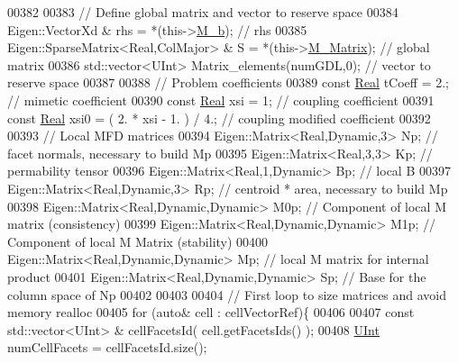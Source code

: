 \begin{DoxyCode}
00382 
00383     \textcolor{comment}{// Define global matrix and vector to reserve space}
00384     Eigen::VectorXd & rhs                       = *(this->\hyperlink{classFVCode3D_1_1StiffMatrix_a5bbfb34d8ef115d2806d5ded5ff109d0}{M\_b});         \textcolor{comment}{// rhs  }
00385     Eigen::SparseMatrix<Real,ColMajor> & S      = *(this->\hyperlink{classFVCode3D_1_1MatrixHandler_ae266bd543d9369501ed9317d9ba6a07b}{M\_Matrix});    \textcolor{comment}{// global matrix}
00386     std::vector<UInt> Matrix\_elements(numGDL,0);                        \textcolor{comment}{// vector to reserve space}
00387     
00388     \textcolor{comment}{// Problem coefficients}
00389     \textcolor{keyword}{const} \hyperlink{namespaceFVCode3D_a40c1f5588a248569d80aa5f867080e83}{Real} tCoeff     = 2.;                            \textcolor{comment}{// mimetic coefficient         }
00390     \textcolor{keyword}{const} \hyperlink{namespaceFVCode3D_a40c1f5588a248569d80aa5f867080e83}{Real} xsi        = 1;                             \textcolor{comment}{// coupling coefficient}
00391     \textcolor{keyword}{const} \hyperlink{namespaceFVCode3D_a40c1f5588a248569d80aa5f867080e83}{Real} xsi0       = ( 2. * xsi - 1. ) / 4.;        \textcolor{comment}{// coupling modified coefficient}
00392 
00393     \textcolor{comment}{// Local MFD matrices}
00394     Eigen::Matrix<Real,Dynamic,3> Np;         \textcolor{comment}{// facet normals, necessary to build Mp}
00395     Eigen::Matrix<Real,3,3> Kp;               \textcolor{comment}{// permability tensor}
00396     Eigen::Matrix<Real,1,Dynamic> Bp;         \textcolor{comment}{// local B}
00397     Eigen::Matrix<Real,Dynamic,3> Rp;         \textcolor{comment}{// centroid * area, necessary to build Mp}
00398     Eigen::Matrix<Real,Dynamic,Dynamic> M0p;  \textcolor{comment}{// Component of local M matrix (consistency)}
00399     Eigen::Matrix<Real,Dynamic,Dynamic> M1p;  \textcolor{comment}{// Component of local M Matrix (stability)}
00400     Eigen::Matrix<Real,Dynamic,Dynamic> Mp;   \textcolor{comment}{// local M matrix for internal product}
00401     Eigen::Matrix<Real,Dynamic,Dynamic> Sp;   \textcolor{comment}{// Base for the column space of Np}
00402 
00403 
00404     \textcolor{comment}{// First loop to size matrices and avoid memory realloc}
00405     \textcolor{keywordflow}{for} (\textcolor{keyword}{auto}& cell : cellVectorRef)\{
00406                 
00407         \textcolor{keyword}{const} std::vector<UInt> & cellFacetsId( cell.getFacetsIds() );
00408         \hyperlink{namespaceFVCode3D_a4bf7e328c75d0fd504050d040ebe9eda}{UInt} numCellFacets = cellFacetsId.size();

\end{DoxyCode}
